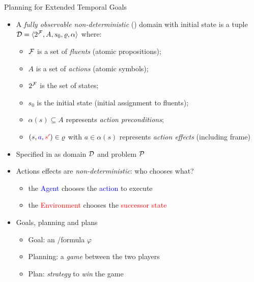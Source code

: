 \documentclass[10pt]{beamer}
\begin{document}
\section{\FONDFOR}

\begin{frame}{\FOND Planning for Extended Temporal Goals}
\begin{itemize}
\item A \textit{fully observable non-deterministic} (\FOND) domain with initial state is a tuple $\D = \tup{2^\F, A, s_0, \varrho, \alpha}$ where:
\begin{itemize}
\item $\F$ is a set of \textit{fluents} (atomic propositions);
\item $A$ is a set of \textit{actions} (atomic symbols);
\item $2^\F$ is the set of states;
\item $s_0$ is the initial state (initial assignment to fluents);
\item $\alpha(s) \subseteq A$ represents \textit{action preconditions};
\item $(s, \color{blue}a, \color{red}s'\color{black}) \in \varrho$ with $a \in \alpha(s)$ represents \textit{action effects} (including frame)
\end{itemize}
\item Specified in \PDDL as domain $\D$ and problem $\P$

\item Actions effects are \emph{non-deterministic}: who chooses what?
\begin{itemize}
\item the \textcolor{blue}{Agent} chooses the \textcolor{blue}{action} to execute
\item the \textcolor{red}{Environment} chooses the \textcolor{red}{successor state}
\end{itemize}

\item Goals, planning and plans
\begin{itemize}
\item Goal: an \LTLf/\PLTL formula $\varphi$
\item Planning: a \emph{game} between the two players
\item Plan: \emph{strategy} to \emph{win} the game
\end{itemize}
\end{itemize}

\end{frame}
\end{document}
